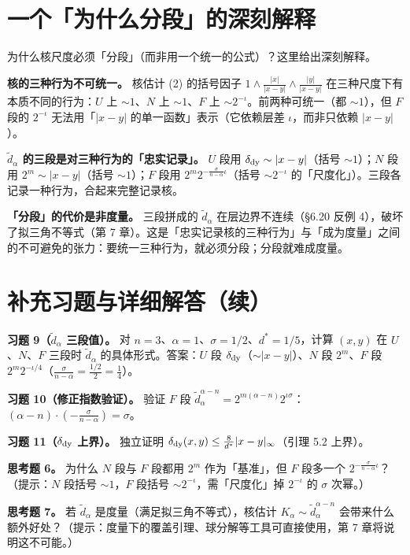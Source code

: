 \documentclass[a4paper,11pt,openany]{ctexbook}
\numberwithin{equation}{chapter}
\numberwithin{figure}{chapter}
\numberwithin{table}{chapter}
\begin{document}
\section{一个「为什么分段」的深刻解释}

为什么核尺度必须「分段」（而非用一个统一的公式）？这里给出深刻解释。

\textbf{核的三种行为不可统一。} 核估计 (2) 的括号因子 $1\wedge\frac{|x|}{|x-y|}\wedge\frac{|y|}{|x-y|}$ 在三种尺度下有本质不同的行为：$U$ 上 $\sim1$、$N$ 上 $\sim1$、$F$ 上 $\sim2^{-\iota}$。前两种可统一（都 $\sim1$），但 $F$ 段的 $2^{-\iota}$ 无法用「$|x-y|$ 的单一函数」表示（它依赖层差 $\iota$，而非只依赖 $|x-y|$）。

\textbf{$\widetilde d_\alpha$ 的三段是对三种行为的「忠实记录」。} $U$ 段用 $\delta_{\rm dy}\sim|x-y|$（括号 $\sim1$）；$N$ 段用 $2^m\sim|x-y|$（括号 $\sim1$）；$F$ 段用 $2^m2^{-\frac{\sigma}{n-\alpha}\iota}$（括号 $\sim2^{-\iota}$ 的「尺度化」）。三段各记录一种行为，合起来完整记录核。

\textbf{「分段」的代价是非度量。} 三段拼成的 $\widetilde d_\alpha$ 在层边界不连续（§6.20 反例 4），破坏了拟三角不等式（第 7 章）。这是「忠实记录核的三种行为」与「成为度量」之间的不可避免的张力：要统一三种行为，就必须分段；分段就难成度量。

\section{补充习题与详细解答（续）}

\textbf{习题 9（$\widetilde d_\alpha$ 三段值）。} 对 $n=3$、$\alpha=1$、$\sigma=1/2$、$d^*=1/5$，计算 $(x,y)$ 在 $U$、$N$、$F$ 三段时 $\widetilde d_\alpha$ 的具体形式。答案：$U$ 段 $\delta_{\rm dy}$（$\sim|x-y|$）、$N$ 段 $2^m$、$F$ 段 $2^m2^{-\iota/4}$（$\frac{\sigma}{n-\alpha}=\frac{1/2}{2}=\frac14$）。

\textbf{习题 10（修正指数验证）。} 验证 $F$ 段 $\widetilde d_\alpha^{\alpha-n}=2^{m(\alpha-n)}2^{\iota\sigma}$：$(\alpha-n)\cdot(-\frac{\sigma}{n-\alpha})=\sigma$。

\textbf{习题 11（$\delta_{\rm dy}$ 上界）。} 独立证明 $\delta_{\rm dy}(x,y)\le\frac8{d^*}|x-y|_\infty$（引理 5.2 上界）。

\textbf{思考题 6。} 为什么 $N$ 段与 $F$ 段都用 $2^m$ 作为「基准」，但 $F$ 段多一个 $2^{-\frac{\sigma}{n-\alpha}\iota}$？（提示：$N$ 段括号 $\sim1$，$F$ 段括号 $\sim2^{-\iota}$，需「尺度化」掉 $2^{-\iota}$ 的 $\sigma$ 次幂。）

\textbf{思考题 7。} 若 $\widetilde d_\alpha$ 是度量（满足拟三角不等式），核估计 $K_\alpha\sim\widetilde d_\alpha^{\alpha-n}$ 会带来什么额外好处？（提示：度量下的覆盖引理、球分解等工具可直接使用，第 7 章将说明这不可能。）
\end{document}

